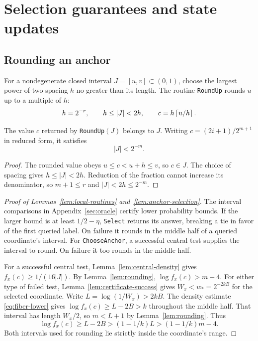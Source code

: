 \section{Selection guarantees and state updates}\label{app:execution}

\subsection{Rounding an anchor}\label{sec:median-search}
For a nondegenerate closed interval $J=[u,v]\subset(0,1)$, choose the
largest power-of-two spacing $h$ no greater than its length. The routine
\texttt{RoundUp} rounds $u$ up to a multiple of $h$:
\begin{equation}\label{eq:round-up}
h=2^{-r},\qquad h\le|J|<2h,\qquad
c=h\left\lceil u/h\right\rceil.
\end{equation}

\begin{lemma}\label{lem:rounding}
The value $c$ returned by \textnormal{\texttt{RoundUp}}$(J)$ belongs to $J$.
Writing $c=(2i+1)/2^{m+1}$ in reduced form, it satisfies
\begin{equation}\label{eq:rounding-length}
|J|<2^{-m}.
\end{equation}
\end{lemma}
\begin{proof}
The rounded value obeys $u\le c<u+h\le v$, so $c\in J$.
The choice of spacing gives $h\le|J|<2h$.
Reduction of the fraction cannot increase its denominator, so
$m+1\le r$ and $|J|<2h\le2^{-m}$.
\end{proof}

\begin{proof}[Proof of Lemmas~\ref{lem:local-routines} and~\ref{lem:anchor-selection}]
The interval comparisons in Appendix~\ref{sec:oracle} certify lower
probability bounds. If the larger bound is at least $1/2-\eta$,
\texttt{Select} returns its answer, breaking a tie in favor of the
first queried label. On failure it rounds in the middle half of a
queried coordinate's interval. For \texttt{ChooseAnchor}, a successful
central test supplies the interval to round. On failure it too rounds
in the middle half.

For a successful central test, Lemma~\ref{lem:central-density} gives
$f_x(c)\ge 1/(16|J|)$. By Lemma~\ref{lem:rounding}, $\log f_x(c)>m-4$. For either type of failed test,
Lemma~\ref{lem:certificate-success} gives $W_x<w_*=2^{-2kB}$ for the
selected coordinate. Write $L=\log(1/W_x)>2kB$. The density estimate
\eqref{eq:fiber-lower} gives $\log f_x(c)\ge L-2B>k$ throughout the middle half.
That interval has length $W_x/2$, so $m<L+1$ by
Lemma~\ref{lem:rounding}. Thus
\[
\log f_x(c)\ge L-2B>(1-1/k)L>(1-1/k)m-4.
\]
Both intervals used for rounding lie strictly inside the coordinate's
range.
\end{proof}

